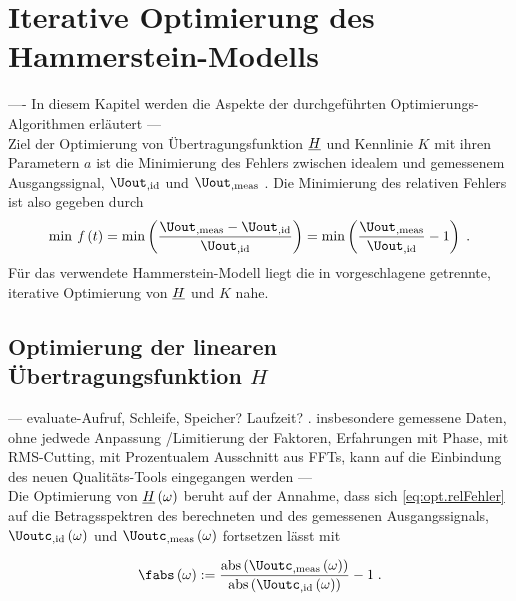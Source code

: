 \documentclass[../Report.tex]{subfiles}
\begin{document}
\chapter{Iterative Optimierung des Hammerstein-Modells}
\label{chap:opt}
---- In diesem Kapitel werden die Aspekte der durchgeführten Optimierungs-Algorithmen erläutert --- \\
Ziel der Optimierung von Übertragungsfunktion $\underline{H}$ und Kennlinie $K$ mit ihren Parametern $a$ ist die Minimierung des Fehlers zwischen idealem und gemessenem Ausgangssignal, $\Uout_{, \mathrm{id}}$ und $\Uout_{, \mathrm{meas}}$ . Die Minimierung des relativen Fehlers ist also gegeben durch
\begin{align}
\label{eq:opt.relFehler}
	\min \; \mathit{f} \oft = \min \left( \frac{\Uout_{, \mathrm{meas}}  - \Uout_{, \mathrm{id}} }{ \Uout_{, \mathrm{id}} } \right) 
	= \min \left( \frac{ \Uout_{, \mathrm{meas}}}{ \Uout_{, \mathrm{id}}} -1 \right) 
	\; .
\end{align}
Für das verwendete Hammerstein-Modell liegt die in \cite{----Jens---} %
vorgeschlagene getrennte, iterative Optimierung von $\underline{H}$ und $K$ nahe. 




\section{Optimierung der linearen Übertragungsfunktion $H$}
\label{sec:opt.H}
--- evaluate-Aufruf, Schleife, Speicher? Laufzeit? . insbesondere gemessene Daten, ohne jedwede Anpassung /Limitierung der Faktoren, Erfahrungen mit Phase, mit RMS-Cutting, mit Prozentualem Ausschnitt aus FFTs, kann auf die Einbindung des neuen Qualitäts-Tools eingegangen werden --- \\

Die Optimierung von $\underline{H} \left( \omega \right)$ beruht auf der Annahme, dass sich \eqref{eq:opt.relFehler} auf die Betragsspektren des berechneten und des gemessenen Ausgangssignals, $\Uoutc_{, \mathrm{id}} \ofomega $ und $\Uoutc_{, \mathrm{meas}} \ofomega $ fortsetzen lässt mit 

\begin{align}
\label{eq:opt.ratio}
	\fabs \ofomega :=  
				\frac{\mathrm{abs} \left( \Uoutc_{, \mathrm{meas}} \ofomega \right)}{\mathrm{abs} \left(\Uoutc_{, \mathrm{id}} \ofomega \right)} -1
				\; .
\end{align} 
\end{document}
